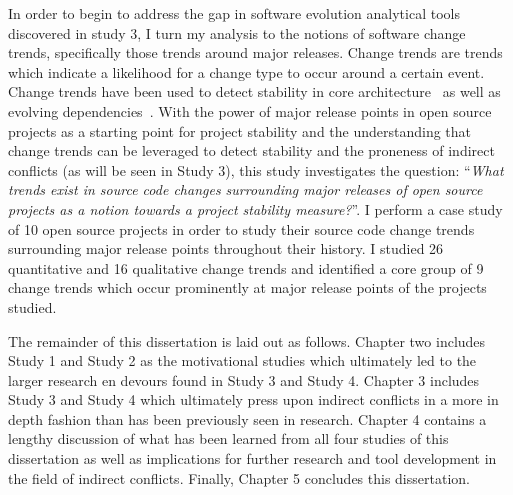 In order to begin to address the gap in software evolution analytical tools discovered in study 3, I turn my analysis to the notions 
of software change trends, specifically those trends around major releases. Change trends are trends which indicate
a likelihood for a change type to occur around a certain event. Change trends have been used to detect
stability in core architecture~\cite{Wermelinger:2008:AEE} as well as evolving dependencies~\cite{Businge:2010:ESE}.
With the power of major release points in open source projects as a starting point for project stability and the understanding that change trends can
be leveraged to detect stability and the proneness of indirect conflicts (as will be seen in Study 3), this study investigates the question:
``\textit{What trends exist in source code changes surrounding major releases of open source projects as a notion towards a project
stability measure?}''. I perform a case study of 10 open source projects in order to study their source code change trends surrounding major release points
throughout their history. I studied 26 quantitative and 16 qualitative change trends and identified a core group of 9 change trends which occur
prominently at major release points of the projects studied.

The remainder of this dissertation is laid out as follows. Chapter two includes Study 1 and Study 2 as the motivational studies which
ultimately led to the larger research en devours found in Study 3 and Study 4. Chapter 3 includes Study 3 and Study 4 which ultimately
press upon indirect conflicts in a more in depth fashion than has been previously seen in research. Chapter 4 contains a lengthy discussion
of what has been learned from all four studies of this dissertation as well as implications for further research and tool development
in the field of indirect conflicts. Finally, Chapter 5 concludes this dissertation.
